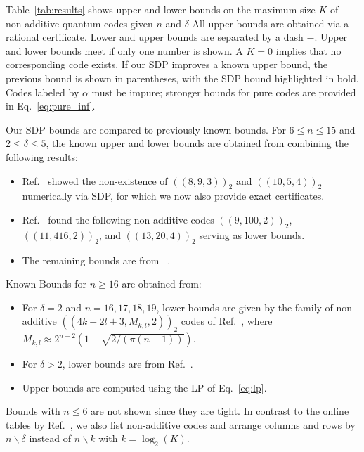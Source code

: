 \documentclass[12pt,a4paper]{amsart}
\begin{document}
Table~\ref{tab:results} shows 
upper and lower bounds on the 
maximum size $K$ of non-additive quantum codes given $n$ and $\delta$
%
All upper bounds are obtained via a rational certificate.
% 
Lower and upper bounds are separated by a dash $-$. 
Upper and lower bounds meet
if only one number is shown.
A $K=0$ implies that no corresponding code exists.
%
If our SDP improves a known upper bound, the previous bound is shown in parentheses, with the SDP bound highlighted in bold.
%
Codes labeled by $\alpha$ must be impure; stronger bounds for pure codes are provided in Eq.~\eqref{eq:pure_inf}.

Our SDP bounds are compared to previously known bounds.
For 
$6\leq n \leq 15$ and 
$2\leq \delta \leq  5$, the known upper and lower bounds are obtained from combining the following results: 
% 
\begin{itemize}\setlength{\itemsep}{3pt}
    \item[(i)] Ref.~\cite{munne2025sdpboundsquantumcodes} showed the non-existence of $(\!(8,9,3)\!)_2$ and $(\!(10,5,4)\!)_2$ numerically via SDP, 
    for which we now also provide exact certificates.
    \item[(ii)]     Ref.~\cite{Rigby_2019} found the following non-additive codes $(\!(9,100,2)\!)_2$, $(\!(11,416,2)\!)_2$, and $(\!(13,20,4)\!)_2$ serving as lower bounds.
    \item[(iii)]     The remaining bounds are from
    ~\cite[Table III]{Rigby_2019}.
\end{itemize} 

\smallskip
Known Bounds for $n\geq 16$ are obtained from:
% 
\begin{itemize}\setlength{\itemsep}{3pt}
    \item[(i)] For $\delta=2$
    and $n=16,17,18,19$,
    lower bounds 
 are given by the family of non-additive
$(\!(4k +2l +3, M_{k,l}, 2)\!)_2$
 codes 
 of Ref.~\cite{PhysRevLett.99.130505},
where 
$M_{k,l} \approx 2^{n-2}(1-\sqrt{2/(\pi(n - 1))})$.
 
 \item[(ii)] For $\delta>2$, lower bounds are from Ref.~\cite{table}.
 
 \item[(iii)] Upper bounds are computed using the LP of Eq.~\eqref{eq:lp}.
\end{itemize}
% 
Bounds with $n\leq6$ are not shown since they are tight.
% 
In contrast to the online tables by Ref.~\cite{table}, we also list non-additive codes and arrange columns and rows by $n\backslash\delta$ instead of $n\backslash k$ with $k=\log_2(K)$. 
\end{document}
